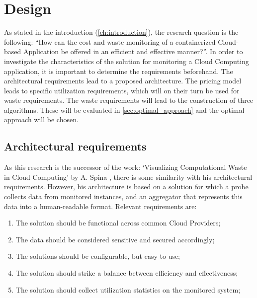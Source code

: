 \chapter{Design}\label{ch:design} %
As stated in the introduction (\autoref{ch:introduction}), the research question is the following: ``How can the cost and waste monitoring of a containerized Cloud-based Application be offered in an efficient and effective manner?''. In order to investigate the characteristics of the solution for monitoring a Cloud Computing application, it is important to determine the requirements beforehand. The architectural requirements lead to a proposed architecture. The pricing model leads to specific utilization requirements, which will on their turn be used for waste requirements. The waste requirements will lead to the construction of three algorithms. These will be evaluated in \autoref{sec:optimal_approach} and the optimal approach will be chosen.

\section{Architectural requirements} \label{sec:architectural_req}
As this research is the successor of the work: `Visualizing Computational Waste in Cloud Computing' by A. Spina \cite{spina}, there is some similarity with his architectural requirements. However, his architecture is based on a solution for which a probe collects data from monitored instances, and an aggregator that represents this data into a human-readable format. Relevant requirements are:
\begin{enumerate}
    \item The solution should be functional across common Cloud Providers;
    \item The data should be considered sensitive and secured accordingly;
    \item The solutions should be configurable, but easy to use;
    \item The solution should strike a balance between efficiency and effectiveness;
    \item The solution should collect utilization statistics on the monitored system;
\end{enumerate}

